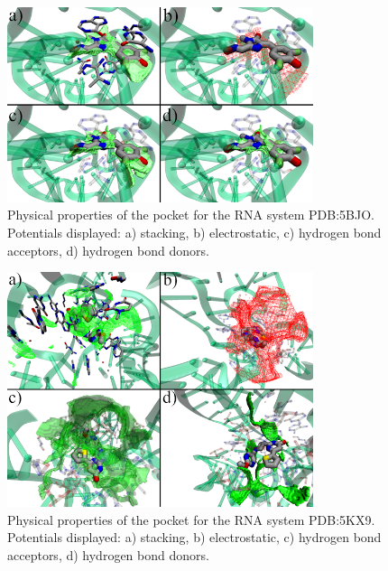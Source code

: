 \begin{figure}[H]
  \centering
  \includegraphics[width=0.8\textwidth]{figures/appendix/benchmark_rna/5bjo.png}
  \caption{\label{fig:appx_benchmark/5bjo} Physical properties of the pocket for the RNA system PDB:5BJO. Potentials displayed: a) stacking, b) electrostatic, c) hydrogen bond acceptors, d) hydrogen bond donors.}
\end{figure}

\begin{figure}[H]
  \centering
  \includegraphics[width=0.8\textwidth]{figures/appendix/benchmark_rna/5kx9.png}
  \caption{\label{fig:appx_benchmark/5kx9} Physical properties of the pocket for the RNA system PDB:5KX9. Potentials displayed: a) stacking, b) electrostatic, c) hydrogen bond acceptors, d) hydrogen bond donors.}
\end{figure}

